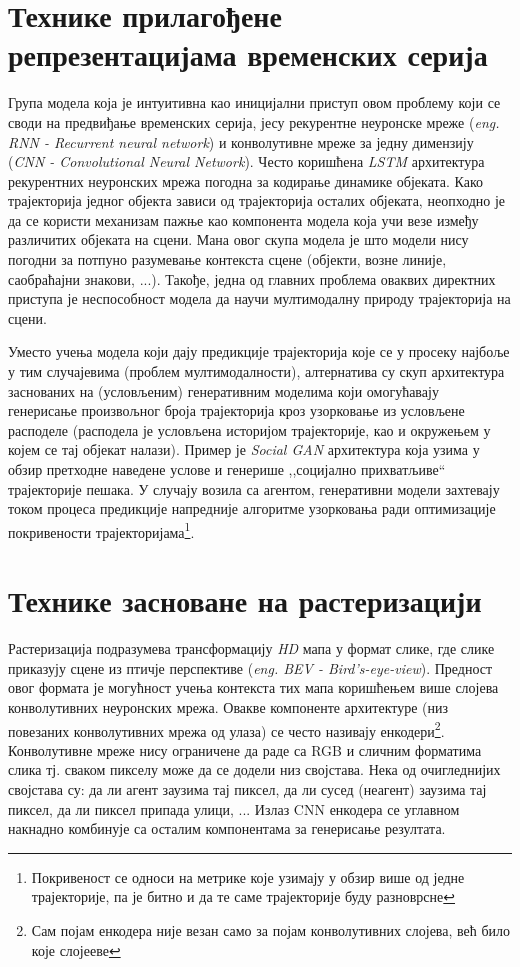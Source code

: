 \documentclass[11pt,oneside]{memoir}
\begin{document}
\section{Технике прилагођене репрезентацијама временских серија}

Група модела која је интуитивна као иницијални приступ овом проблему који се своди на предвиђање временских серија, јесу рекурентне неуронске мреже 
(\textit{eng. RNN - Recurrent neural network}) и конволутивне мреже за једну димензију (\textit{CNN - Convolutional Neural Network}). 
Често коришћена \textit{LSTM} архитектура рекурентних неуронских мрежа погодна за кодирање динамике објеката. 
Како трајекторија једног објекта зависи од трајекторија осталих објеката,
неопходно је да се користи механизам пажње као компонента модела која учи везе између различитих објеката на сцени. \cite{argoverse} \cite{social_lstm} 
Мана овог скупа модела је што модели нису погодни за потпуно разумевање контекста сцене (објекти, возне линије, саобраћајни знакови, ...). Такође,
једна од главних проблема оваквих директних приступа је неспособност модела да научи мултимодалну природу трајекторија на сцени.

Уместо учења модела који дају предикције трајекторија које се у просеку најбоље у тим случајевима (проблем мултимодалности), 
алтернатива су скуп архитектура заснованих на (условљеним) генеративним моделима који
омогућавају генерисање произвољног броја трајекторија кроз узорковање из условљене расподеле (расподела је условљена историјом трајекторије, као и
окружењем у којем се тај објекат налази). Пример је \textit{Social GAN} \cite{social_gan} архитектура која узима у обзир претходне наведене услове и генерише 
,,социјално прихватљиве`` трајекторије пешака. 
У случају возила са агентом, генеративни модели захтевају током процеса предикције напредније алгоритме узорковања ради оптимизације покривености
трајекторијама\footnote{Покривеност се односи на метрике које узимају у обзир више од једне трајекторије, па је битно и да те
саме трајекторије буду разноврсне}.

\section{Технике засноване на растеризацији}

Растеризација подразумева трансформацију \textit{HD} мапа у формат слике, где слике приказују сцене из птичје 
перспективе (\textit{eng. BEV - Bird's-eye-view}).
Предност овог формата је могућност учења контекста тих мапа коришћењем више слојева конволутивних неуронских мрежа.
Овакве компоненте архитектуре (низ повезаних конволутивних мрежа од улаза) се често називају енкодери\footnote{Сам појам енкодера није везан само 
за појам конволутивних слојева, већ било које слојееве}. 
Конволутивне мреже нису ограничене да раде са RGB и сличним форматима слика тј. сваком пикселу може да се додели низ својстава. 
Нека од очигледнијих својстава су: да ли агент заузима тај пиксел, да ли сусед (неагент) заузима тај пиксел,
да ли пиксел припада улици, ... Излаз CNN енкодера се углавном накнадно комбинује са осталим компонентама за генерисање резултата. 
\end{document}
